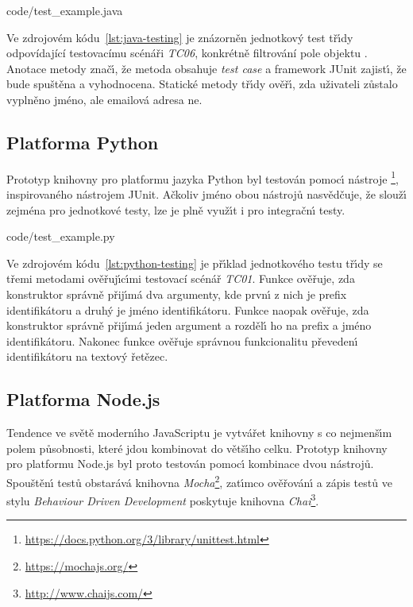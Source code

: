 
{code/test_example.java}

Ve zdrojovém kódu~\ref{lst:java-testing} je znázorněn jednotkov\'y test
tř\'{\i}dy  odpovídající testovacímu scénáři \textit{TC06}, konkrétně
filtrování pole  objektu . Anotace  metody  znač\'{\i},
že metoda obsahuje \textit{test case} a framework JUnit zajist\'{\i}, že bude spuštěna
a vyhodnocena. Statické metody tř\'{\i}dy  ověř\'{\i}, zda uživateli zůstalo
vyplněno jméno, ale emailová adresa ne.

\subsection{Platforma Python}

Prototyp knihovny pro platformu jazyka Python byl testován pomoc\'{\i}
nástroje \footnote{\url{https://docs.python.org/3/library/unittest.html}}, inspirovaného nástrojem
JUnit. Ačkoliv jméno obou nástrojů nasvědčuje, že slouž\'{\i} zejména pro jednotkové testy,
lze je plně využ\'{\i}t i pro integračn\'{\i} testy.


{code/test_example.py}

Ve zdrojovém kódu~\ref{lst:python-testing} je př\'{\i}klad jednotkového testu tř\'{\i}dy
 se třemi metodami ověřuj\'{\i}c\'{\i}mi testovací scénář \textit{TC01}.
Funkce  ověřuje, zda konstruktor správně přij\'{\i}má dva argumenty,
kde prvn\'{\i} z nich je prefix identifikátoru a druh\'y je jméno identifikátoru.
Funkce  naopak ověřuje, zda konstruktor správně přij\'{\i}má jeden
argument a rozděl\'{\i} ho na prefix a jméno identifikátoru.
Nakonec funkce  ověřuje správnou funkcionalitu převeden\'{\i}
identifikátoru na textov\'y řetězec.

\subsection{Platforma Node.js}

Tendence ve světě modern\'{\i}ho JavaScriptu je vytvářet knihovny s co nejmenš\'{\i}m polem působnosti,
které jdou kombinovat do větš\'{\i}ho celku. Prototyp knihovny pro platformu Node.js byl proto testován pomoc\'{\i}
kombinace dvou nástrojů. Spouštěn\'{\i} testů obstarává knihovna \textit{Mocha}\footnote{\url{https://mochajs.org/}}, zat\'{\i}mco
ověřován\'{\i} a zápis testů ve stylu \textit{Behaviour Driven Development} poskytuje knihovna \textit{Chai}\footnote{\url{http://www.chaijs.com/}}.

